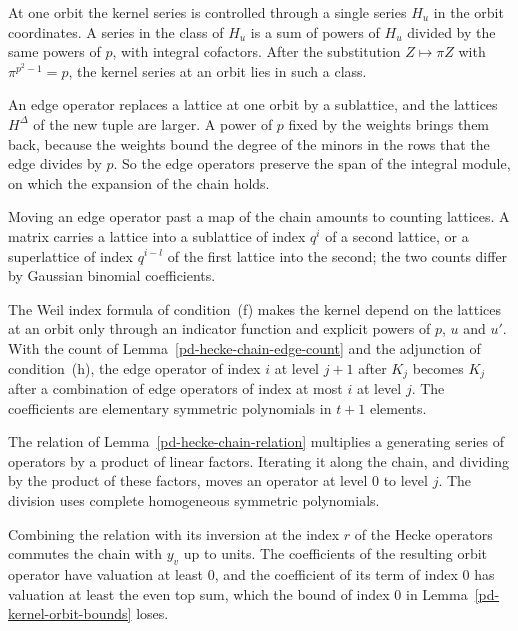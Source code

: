 At one orbit the kernel series is controlled through a single series $H_u$ in the orbit coordinates. A
series in the class of $H_u$ is a sum of powers of $H_u$ divided by the same powers of $p$, with integral
cofactors. After the substitution $Z\mapsto\pi Z$ with $\pi^{p^2-1}=p$, the kernel series at an orbit lies
in such a class.

An edge operator replaces a lattice at one orbit by a sublattice, and the lattices $H^\Delta$ of the new
tuple are larger. A power of $p$ fixed by the weights brings them back, because the weights bound the
degree of the minors in the rows that the edge divides by $p$. So the edge operators preserve the span of
the integral module, on which the expansion of the chain holds.

Moving an edge operator past a map of the chain amounts to counting lattices. A matrix carries a lattice
into a sublattice of index $q^i$ of a second lattice, or a superlattice of index $q^{i-l}$ of the first
lattice into the second; the two counts differ by Gaussian binomial coefficients.

The Weil index formula of condition~(f) makes the kernel depend on the lattices at an orbit only through
an indicator function and explicit powers of $p$, $u$ and $u'$. With the count of
Lemma~\ref{pd-hecke-chain-edge-count} and the adjunction of condition~(h), the edge operator of index $i$
at level $j+1$ after $K_j$ becomes $K_j$ after a combination of edge operators of index at most $i$ at
level $j$. The coefficients are elementary symmetric polynomials in $t+1$ elements.

The relation of Lemma~\ref{pd-hecke-chain-relation} multiplies a generating series of operators by a
product of linear factors. Iterating it along the chain, and dividing by the product of these factors,
moves an operator at level $0$ to level $j$. The division uses complete homogeneous symmetric
polynomials.

Combining the relation with its inversion at the index $r$ of the Hecke operators commutes the chain with
$y_v$ up to units. The coefficients of the resulting orbit operator have valuation at least $0$, and the
coefficient of its term of index $0$ has valuation at least the even top sum, which the bound of index $0$
in Lemma~\ref{pd-kernel-orbit-bounds} loses.

